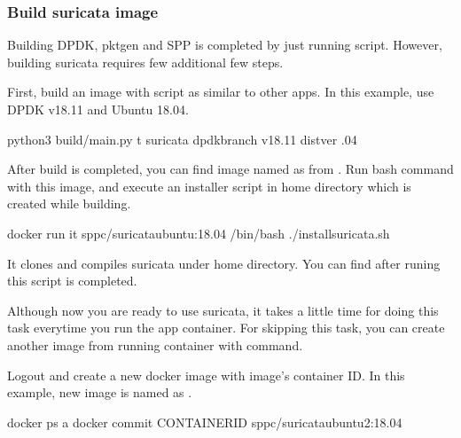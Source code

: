 \documentclass[a4paper,11pt,openany,oneside,english]{sphinxmanual}
\begin{document}
\subsubsection{Build suricata image}
\label{\detokenize{tools/sppc/build_img:build-suricata-image}}\label{\detokenize{tools/sppc/build_img:sppc-build-img-suricata}}
Building DPDK, pktgen and SPP is completed by just running 
script. However, building suricata requires few additional few steps.

First, build an image with  script as similar to other apps.
In this example, use DPDK v18.11 and Ubuntu 18.04.

\begin{sphinxVerbatim}[commandchars=\\\{\},formatcom=\footnotesize]
 python3 build/main.py \PYGZhy{}t suricata \PYGZhy{}\PYGZhy{}dpdk\PYGZhy{}branch v18.11 \PYGZhy{}\PYGZhy{}dist\PYGZhy{}ver .04
\end{sphinxVerbatim}

After build is completed, you can find image named as
 from .
Run bash command with this image, and execute an installer script in home
directory which is created while building.

\begin{sphinxVerbatim}[commandchars=\\\{\},formatcom=\footnotesize]
 docker run \PYGZhy{}it sppc/suricata\PYGZhy{}ubuntu:18.04 /bin/bash
 ./install\PYGZus{}suricata.sh
\end{sphinxVerbatim}

It clones and compiles suricata under home directory. You can find
 after runing this script is completed.

Although now you are ready to use suricata, it takes a little time for doing
this task everytime you run the app container.
For skipping this task, you can create another image from running container
with  command.

Logout and create a new docker image with  image’s
container ID. In this example, new image is named as
.

\begin{sphinxVerbatim}[commandchars=\\\{\},formatcom=\footnotesize]
 
 docker ps \PYGZhy{}a
 docker commit CONTAINER\PYGZus{}ID sppc/suricata\PYGZhy{}ubuntu2:18.04
\end{sphinxVerbatim}
\end{document}
